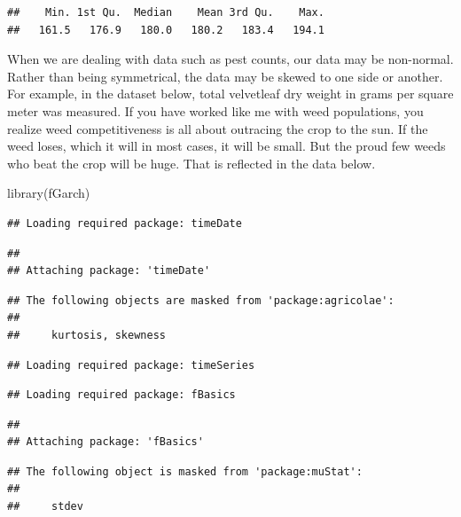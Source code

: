 \documentclass[
]{book}
\newenvironment{Shaded}{\begin{snugshade}}{\end{snugshade}}
\newcommand{\FunctionTok}[1]{\textcolor[rgb]{0.00,0.00,0.00}{#1}}
\newcommand{\NormalTok}[1]{#1}
\begin{document}
\begin{verbatim}
##    Min. 1st Qu.  Median    Mean 3rd Qu.    Max. 
##   161.5   176.9   180.0   180.2   183.4   194.1
\end{verbatim}

When we are dealing with data such as pest counts, our data may be non-normal. Rather than being symmetrical, the data may be skewed to one side or another. For example, in the dataset below, total velvetleaf dry weight in grams per square meter was measured. If you have worked like me with weed populations, you realize weed competitiveness is all about outracing the crop to the sun. If the weed loses, which it will in most cases, it will be small. But the proud few weeds who beat the crop will be huge. That is reflected in the data below.

\begin{Shaded}
\begin{Highlighting}[]
\FunctionTok{library}\NormalTok{(fGarch)}
\end{Highlighting}
\end{Shaded}

\begin{verbatim}
## Loading required package: timeDate
\end{verbatim}

\begin{verbatim}
## 
## Attaching package: 'timeDate'
\end{verbatim}

\begin{verbatim}
## The following objects are masked from 'package:agricolae':
## 
##     kurtosis, skewness
\end{verbatim}

\begin{verbatim}
## Loading required package: timeSeries
\end{verbatim}

\begin{verbatim}
## Loading required package: fBasics
\end{verbatim}

\begin{verbatim}
## 
## Attaching package: 'fBasics'
\end{verbatim}

\begin{verbatim}
## The following object is masked from 'package:muStat':
## 
##     stdev
\end{verbatim}
\end{document}
